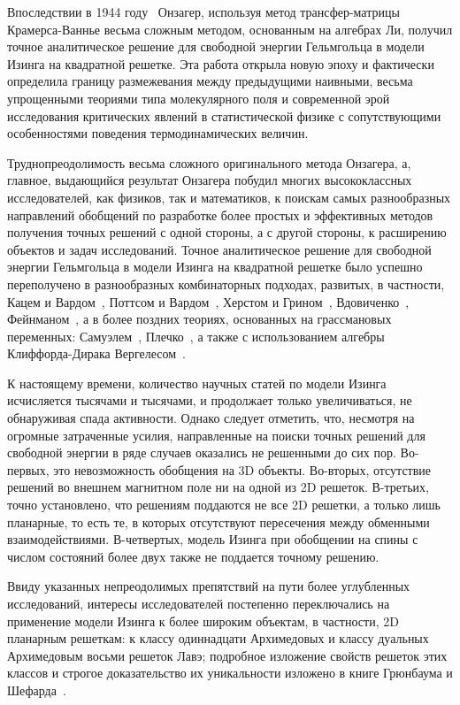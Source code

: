 \documentclass[utf8,12pt]{jetp}
\begin{document}
Впоследствии в 1944 году~\cite{onsager1941} Онзагер, используя метод трансфер-матрицы Крамерса-Ваннье весьма сложным методом, основанным на алгебрах Ли, получил точное аналитическое решение для свободной энергии Гельмгольца в модели Изинга на квадратной решетке. Эта работа открыла новую эпоху и фактически определила границу размежевания между предыдущими наивными, весьма упрощенными теориями типа молекулярного поля и современной эрой исследования критических явлений в статистической физике с сопутствующими особенностями поведения термодинамических величин. 

Труднопреодолимость весьма сложного оригинального метода Онзагера, а, главное, выдающийся результат Онзагера побудил многих высококлассных исследователей, как физиков, так и математиков, к поискам самых разнообразных направлений обобщений по разработке более простых и эффективных методов получения точных решений с одной стороны, а с другой стороны, к расширению объектов и задач исследований. Точное аналитическое решение для свободной энергии Гельмгольца в модели Изинга на квадратной решетке было успешно переполучено в разнообразных комбинаторных подходах, развитых, в частности, Кацем и Вардом~\cite{kac1952}, Поттсом и Вардом~\cite{potts1955}, Херстом и Грином~\cite{hurst1960}, Вдовиченко~\cite{vdovichenko1964, vdovichenko1965}, Фейнманом~\cite{feynman1972}, а в более поздних теориях, основанных на грассмановых переменных: Самуэлем~\cite{samuel1980}, Плечко~\cite{plechko1985}, а также с использованием алгебры Клиффорда-Дирака Вергелесом~\cite{vergeles2009}.

К настоящему времени, количество научных статей по модели Изинга исчисляется тысячами и тысячами, и продолжает только увеличиваться, не обнаруживая спада активности. Однако следует отметить, что, несмотря на огромные затраченные усилия, направленные на поиски точных решений для свободной энергии в ряде случаев оказались не решенными до сих пор. Во-первых, это невозможность обобщения на 3D объекты. Во-вторых, отсутствие решений во внешнем магнитном поле ни на одной из 2D решеток. В-третьих, точно установлено, что решениям поддаются не все 2D решетки, а только лишь планарные, то есть те, в которых отсутствуют пересечения между обменными взаимодействиями. В-четвертых, модель Изинга при обобщении на спины с числом состояний более двух также не поддается точному решению. 

Ввиду указанных непреодолимых препятствий на пути более углубленных исследований, интересы исследователей постепенно переключались на применение модели Изинга к более широким объектам, в частности, 2D планарным решеткам: к классу одиннадцати Архимедовых и классу дуальных Архимедовым восьми решеток Лавэ; подробное изложение свойств решеток этих классов и строгое доказательство их уникальности изложено в книге Грюнбаума и Шефарда~\cite{grunbaum1987}. 
\end{document}
